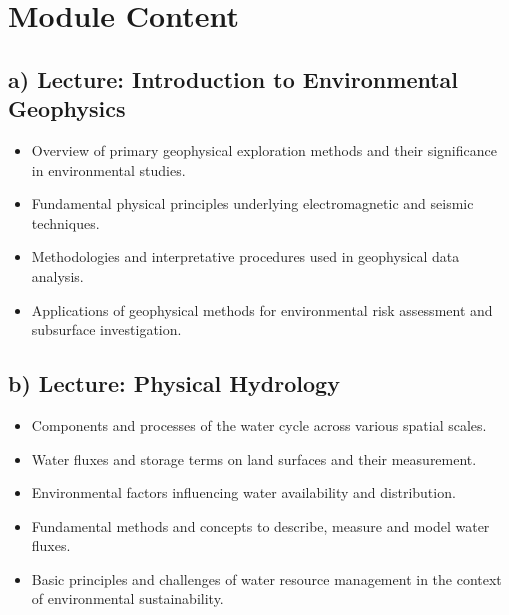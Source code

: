 \documentclass[
  letterpaper,
  10pt,
  openany]{book}
\providecommand{\tightlist}{%
  \setlength{\itemsep}{0pt}\setlength{\parskip}{0pt}}\usepackage{longtable,booktabs,array}
\begin{document}
\section*{Module Content}\label{module-content}


\subsection*{a) Lecture: Introduction to Environmental
Geophysics}\label{a-lecture-introduction-to-environmental-geophysics-1}

\begin{itemize}
\tightlist
\item
  Overview of primary geophysical exploration methods and their
  significance in environmental studies.
\item
  Fundamental physical principles underlying electromagnetic and seismic
  techniques.
\item
  Methodologies and interpretative procedures used in geophysical data
  analysis.
\item
  Applications of geophysical methods for environmental risk assessment
  and subsurface investigation.
\end{itemize}

\subsection*{b) Lecture: Physical
Hydrology}\label{b-lecture-physical-hydrology-1}

\begin{itemize}
\tightlist
\item
  Components and processes of the water cycle across various spatial
  scales.
\item
  Water fluxes and storage terms on land surfaces and their measurement.
\item
  Environmental factors influencing water availability and distribution.
\item
  Fundamental methods and concepts to describe, measure and model water
  fluxes.
\item
  Basic principles and challenges of water resource management in the
  context of environmental sustainability.
\end{itemize}
\end{document}
